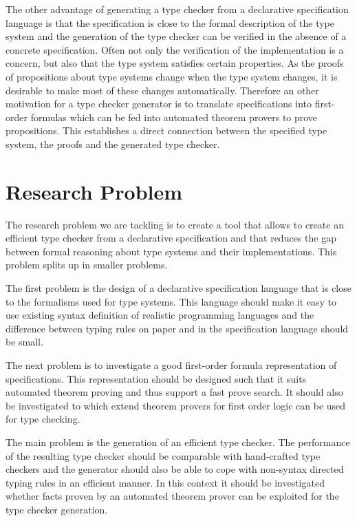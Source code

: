\documentclass{acm_proc_article-sp}
\begin{document}
The other advantage of generating a type checker from a declarative
specification language is that the specification is close to the
formal description of the type system and the generation of the type
checker can be verified in the absence of a concrete
specification. Often not only the verification of the implementation
is a concern, but also that the type system satisfies certain
properties. As the proofs of propositions about type systems change
when the type system changes, it is desirable to make most of these
changes automatically. Therefore an other motivation for a type
checker generator is to translate specifications into first-order
formulas which can be fed into automated theorem provers to prove
propositions. This establishes a direct connection between the
specified type system, the proofs  and the generated type checker.

\section{Research Problem}
The research problem we are tackling is to create a tool that allows
to create an efficient type checker from a declarative specification
and that reduces the gap between formal reasoning about type systems
and their implementations. This problem splits up in smaller problems.

The first problem is the design of a declarative specification
language that is close to the formalisms used for type systems. This
language should make it easy to use existing syntax definition of
realistic programming languages and the difference between typing
rules on paper and in the specification language should be small.

The next problem is to investigate a good first-order formula
representation of specifications. This representation should be
designed such that it suits automated theorem proving and thus support
a fast prove search. It should also be investigated to which extend
theorem provers for first order logic can be used for type checking.

The main problem is the generation of an efficient type checker. The
performance of the resulting type checker should be comparable with
hand-crafted type checkers and the generator should also be able to
cope with non-syntax directed typing rules in an efficient manner. In
this context it should be investigated whether facts proven by an
automated theorem prover can be exploited for the type checker
generation.
\end{document}
